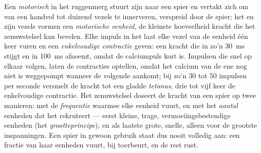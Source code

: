 \begin{definition}\label{def:b2:muscle-movement:motorunit}
Een \emph{motorisch } in het ruggenmerg stuurt zijn  naar een spier
en vertakt zich om van een handvol tot duizend vezels te innerveren, verspreid
door de spier; het  en zijn vezels vormen een \emph{motorische
eenheid}, de kleinste hoeveelheid kracht die het zenuwstelsel kan bevelen.
Elke impuls in het  laat elke vezel van de eenheid één keer vuren en
een \emph{enkelvoudige contractie} geven: een kracht die in zo'n \qty{30}{ms}
stijgt en in \qty{100}{ms} afneemt, omdat de calciumpuls kort is. Impulsen
die snel op elkaar volgen, laten de contracties optellen, omdat het calcium
van de ene nog niet is weggepompt wanneer de volgende aankomt; bij zo'n 30
tot 50 impulsen per seconde versmelt de kracht tot een gladde
\emph{tetanus}, drie tot vijf keer de enkelvoudige contractie. Het
zenuwstelsel doseert de kracht van een spier op twee manieren: met de
\emph{frequentie} waarmee elke eenheid vuurt, en met het \emph{aantal}
eenheden dat het rekruteert --- eerst kleine, trage, vermoeiingsbestendige
eenheden (het \emph{grootteprincipe}), en als laatste grote, snelle, alleen
voor de grootste inspanningen. Een spier in gewoon gebruik staat dus nooit
volledig aan: een fractie van haar eenheden vuurt, bij toerbeurt, en de rest
rust.
\end{definition}

